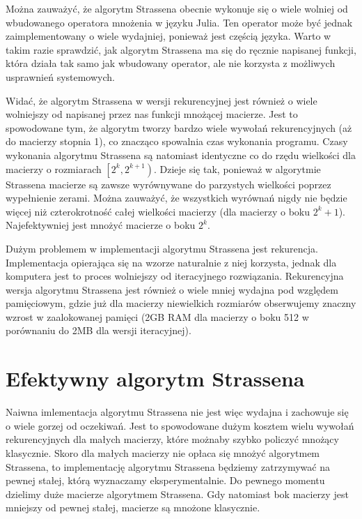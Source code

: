 \documentclass[paper=a4, fontsize=11pt]{scrartcl} %
\numberwithin{equation}{section} %
\numberwithin{figure}{section} %
\numberwithin{table}{section} %
\begin{document}
Można zauważyć, że algorytm Strassena obecnie wykonuje się o wiele wolniej od wbudowanego operatora mnożenia w języku Julia.
Ten operator może być jednak zaimplementowany o wiele wydajniej, ponieważ jest częścią języka.
Warto w takim razie sprawdzić, jak algorytm Strassena ma się do ręcznie napisanej
funkcji, która działa tak samo jak wbudowany operator, ale nie korzysta z możliwych usprawnień systemowych.\medbreak

Widać, że algorytm Strassena w wersji rekurencyjnej jest również o wiele wolniejszy od napisanej przez nas funkcji mnożącej macierze.
Jest to spowodowane tym, że algorytm tworzy bardzo wiele wywołań rekurencyjnych (aż do macierzy stopnia 1), co znacząco spowalnia czas wykonania programu. \medbreak
Czasy wykonania algorytmu Strassena są natomiast identyczne co do rzędu wielkości dla macierzy o rozmiarach ${\left[2^k, 2^{k+1} \right)}$.
Dzieje się tak, ponieważ w algorytmie Strassena macierze są zawsze wyrównywane do parzystych wielkości poprzez wypełnienie zerami.
Można zauważyć, że wszystkich wyrównań nigdy nie będzie więcej niż czterokrotność całej wielkości macierzy (dla macierzy o boku ${2^k+1}$).
Najefektywniej jest mnożyć macierze o boku ${2^k}$.\medbreak

Dużym problemem w implementacji algorytmu Strassena jest rekurencja.
Implementacja opierająca się na wzorze naturalnie z niej korzysta, jednak dla komputera
jest to proces wolniejszy od iteracyjnego rozwiązania. Rekurencyjna wersja algorytmu 
Strassena jest również o wiele mniej wydajna pod względem pamięciowym, gdzie już dla macierzy niewielkich rozmiarów obserwujemy znaczny wzrost w zaalokowanej pamięci 
(2GB RAM dla macierzy o boku 512 w porównaniu do 2MB dla wersji iteracyjnej).

\section{Efektywny algorytm Strassena}
Naiwna imlementacja algorytmu Strassena nie jest więc wydajna i zachowuje się o wiele gorzej od oczekiwań.
Jest to spowodowane dużym kosztem wielu wywołań rekurencyjnych dla małych macierzy, które możnaby szybko policzyć mnożący klasycznie.
Skoro dla małych macierzy nie opłaca się mnożyć algorytmem Strassena,
to implementację algorytmu Strassena będziemy zatrzymywać na pewnej stałej, którą wyznaczamy eksperymentalnie.
Do pewnego momentu dzielimy duże macierze algorytmem Strassena.
Gdy natomiast bok macierzy jest mniejszy od pewnej stałej, macierze są mnożone klasycznie.\medbreak
\end{document}
